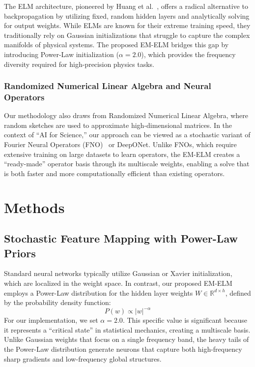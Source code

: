 \documentclass[final,12pt,3p,times,fleqn]{elsarticle}
\begin{document}
The ELM architecture, pioneered by Huang et al.~\cite{huang2006extreme}, offers a radical alternative to backpropagation by utilizing fixed, random hidden layers and analytically solving for output weights. While ELMs are known for their extreme training speed, they traditionally rely on Gaussian initializations that struggle to capture the complex manifolds of physical systems. The proposed EM-ELM bridges this gap by introducing Power-Law initialization ($\alpha=2.0$), which provides the frequency diversity required for high-precision physics tasks.

\subsubsection{Randomized Numerical Linear Algebra and Neural Operators}

Our methodology also draws from Randomized Numerical Linear Algebra, where random sketches are used to approximate high-dimensional matrices. In the context of ``AI for Science,'' our approach can be viewed as a stochastic variant of Fourier Neural Operators (FNO)~\cite{li2020fourier} or DeepONet. Unlike FNOs, which require extensive training on large datasets to learn operators, the EM-ELM creates a ``ready-made'' operator basis through its multiscale weights, enabling a solve that is both faster and more computationally efficient than existing operators.


\section{Methods}

\subsection{Stochastic Feature Mapping with Power-Law Priors}

Standard neural networks typically utilize Gaussian or Xavier initialization, which are localized in the weight space. In contrast, our proposed EM-ELM employs a Power-Law distribution for the hidden layer weights $W \in \mathbb{R}^{d \times h}$, defined by the probability density function:
$$P(w) \propto |w|^{-\alpha}$$
For our implementation, we set $\alpha=2.0$. This specific value is significant because it represents a ``critical state'' in statistical mechanics, creating a multiscale basis. Unlike Gaussian weights that focus on a single frequency band, the heavy tails of the Power-Law distribution generate neurons that capture both high-frequency sharp gradients and low-frequency global structures.
\end{document}
